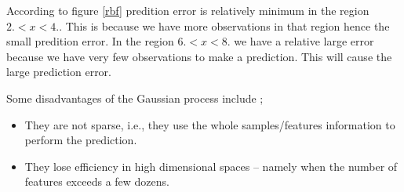\documentclass{article}
\begin{document}
According to figure \ref{rbf} predition error is relatively minimum in the region $2. < x < 4.$. This is because we have more observations in that region hence the small predition error. In the region $6. < x < 8.$ we have a relative large error because we have very few observations to make a prediction. This will cause the large prediction error.

Some disadvantages of the Gaussian process include \cite{scikit-learn};

\begin{itemize}
\item They are not sparse, i.e., they use the whole samples/features information to perform the prediction.
\item They lose efficiency in high dimensional spaces – namely when the number of features exceeds a few dozens.
\end{itemize}


\printbibliography
\end{document}
